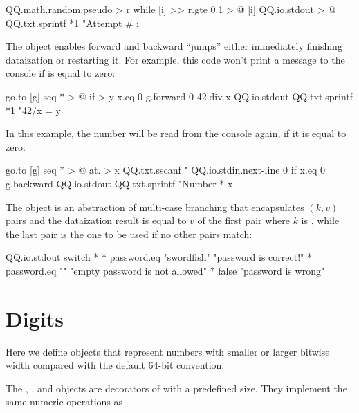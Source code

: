 \documentclass[sigplan,nonacm]{acmart}
\newcommand\deff[1]{\ff{\textcolor{blue!50!black}{\textbf{#1}}}}
\begin{document}
\begin{ffcode}
QQ.math.random.pseudo > r
while
  [i] >>
    r.gte 0.1 > @
  [i]
    QQ.io.stdout > @
      QQ.txt.sprintf *1
        "Attempt #%
        i
\end{ffcode}

The \deff{go} object enables forward and backward ``jumps'' either immediately finishing dataization or restarting it.
For example, this code won't print a message to the console if  is equal to zero:

\begin{ffcode}
go.to
  [g]
    seq * > @
      if > y
        x.eq 0
        g.forward 0
        42.div x
      QQ.io.stdout
        QQ.txt.sprintf *1
          "42/x = %
          y
\end{ffcode}

In this example, the number will be read from the console again, if it is equal to zero:

\begin{ffcode}
go.to
  [g]
    seq * > @
      at. > x
        QQ.txt.sscanf
          "%
          QQ.io.stdin.next-line
        0
      if
        x.eq 0
        g.backward
        QQ.io.stdout
          QQ.txt.sprintf
            "Number %
            * x
\end{ffcode}

The \deff{switch} object is an abstraction of multi-case branching that encapsulates \((k, v)\) pairs and the
dataization result is equal to \(v\) of the first pair where \(k\) is , while the last pair is the one
to be used if no other pairs match:

\begin{ffcode}
QQ.io.stdout
  switch *
    *
      password.eq "swordfish"
      "password is correct!"
    *
      password.eq ""
      "empty password is not allowed"
    *
      false
      "password is wrong"
\end{ffcode}

\section{Digits}\label{sec:digits}

Here we define objects that represent numbers with smaller or larger bitwise width compared with the default 64-bit convention.

The \deff{i16}, \deff{i32}, and \deff{i64} objects are decorators of  with a predefined size.
They implement the same numeric operations as .
\end{document}
